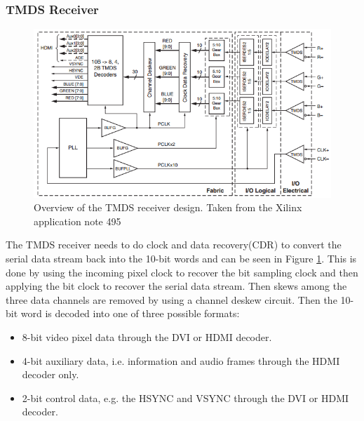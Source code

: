 \subsubsection{TMDS Receiver}
\begin{figure}[h!]
    \centering
    \includegraphics[width=\linewidth]{img/TMDSreceiverdesign.png}
    \caption{Overview of the TMDS receiver design. Taken from the Xilinx application note 495\cite{xapp495}}
    \label{fig:TMDSReceiver}
\end{figure}
The TMDS receiver needs to do clock and data recovery(CDR) to convert the serial data stream back into the 10-bit words and can be seen in Figure \ref{fig:TMDSReceiver}.
This is done by using the incoming pixel clock to recover the bit sampling clock and then applying the bit clock to recover the serial data stream.
Then skews among the three data channels are removed by using a channel deskew circuit.
Then the 10-bit word is decoded into one of three possible formats:
\begin{itemize}
    \item   8-bit video pixel data through the DVI or HDMI decoder.
    \item   4-bit auxiliary data, i.e. information and audio frames through the HDMI decoder only.
    \item   2-bit control data, e.g. the HSYNC and VSYNC through the DVI or HDMI decoder.
\end{itemize}

